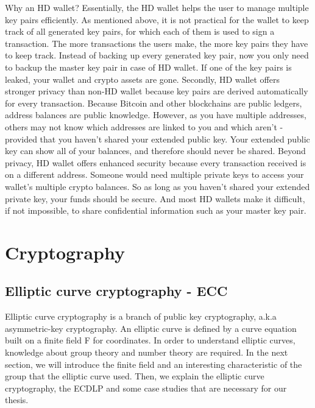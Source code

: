 Why an HD wallet? Essentially, the HD wallet helps the user to manage multiple key pairs efficiently. As mentioned above, it is not practical for the wallet to keep track of all generated key pairs, for which each of them is used to sign a transaction. The more transactions the users make, the more key pairs they have to keep track. Instead of backing up every generated key pair, now you only need to backup the master key pair in case of HD wallet. If one of the key pairs is leaked, your wallet and crypto assets are gone. Secondly,  HD wallet offers stronger privacy than non-HD wallet because key pairs are derived automatically for every transaction. Because Bitcoin and other blockchains are public ledgers, address balances are public knowledge. However, as you have multiple addresses, others may not know which addresses are linked to you and which aren’t - provided that you haven’t shared your extended public key. Your extended public key can show all of your balances, and therefore should never be shared. Beyond privacy, HD wallet offers enhanced security because every transaction received is on a different address. Someone would need multiple private keys to access your wallet’s multiple crypto balances. So as long as you haven’t shared your extended private key, your funds should be secure. And most HD wallets make it difficult, if not impossible, to share confidential information such as your master key pair.\\

\section{Cryptography}
\label{cryptography}

\subsection{Elliptic curve cryptography - ECC}

Elliptic curve cryptography is a branch of public key cryptography, a.k.a asymmetric-key cryptography. An elliptic curve is defined by a curve equation built on a finite field F for coordinates. In order to understand elliptic curves, knowledge about group theory and number theory are required. In the next section, we will introduce the finite field and an interesting characteristic of the group that the elliptic curve used. Then, we explain the elliptic curve cryptography, the ECDLP and some case studies that are necessary for our thesis.\\

